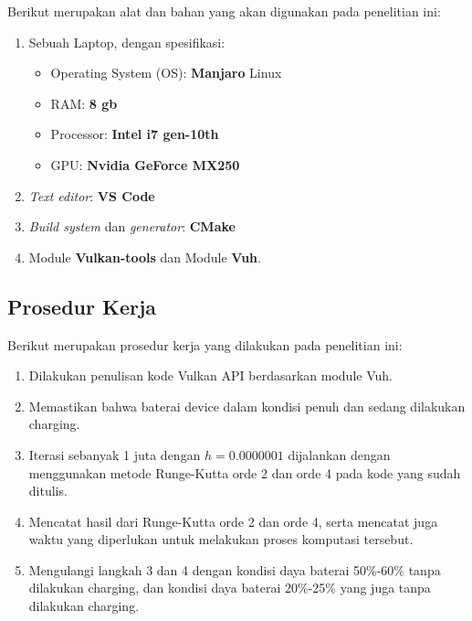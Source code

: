 Berikut merupakan alat dan bahan yang akan digunakan pada penelitian
ini:

\begin{enumerate}
\def\labelenumi{\arabic{enumi}.}
\tightlist
\item
  Sebuah Laptop, dengan spesifikasi:

  \begin{itemize}
  \tightlist
  \item
    Operating System (OS): \textbf{Manjaro} Linux
  \item
    RAM: \textbf{8 gb}
  \item
    Processor: \textbf{Intel i7 gen-10th}
  \item
    GPU: \textbf{Nvidia GeForce MX250}
  \end{itemize}
\item
  \emph{Text editor}: \textbf{VS Code}
\item
  \emph{Build system} dan \emph{generator}: \textbf{CMake}
\item
  Module \textbf{Vulkan-tools} dan Module \textbf{Vuh}.
\end{enumerate}

\hypertarget{prosedur-kerja}{%
\subsection{Prosedur Kerja}\label{prosedur-kerja}}

Berikut merupakan prosedur kerja yang dilakukan pada penelitian ini:

\begin{enumerate}
\def\labelenumi{\arabic{enumi}.}
\tightlist
\item
  Dilakukan penulisan kode Vulkan API berdasarkan module Vuh.
\item
  Memastikan bahwa baterai device dalam kondisi penuh dan sedang
  dilakukan charging.
\item
  Iterasi sebanyak 1 juta dengan \(h = 0.0000001\) dijalankan dengan
  menggunakan metode Runge-Kutta orde 2 dan orde 4 pada kode yang sudah
  ditulis.
\item
  Mencatat hasil dari Runge-Kutta orde 2 dan orde 4, serta mencatat juga
  waktu yang diperlukan untuk melakukan proses komputasi tersebut.
\item
  Mengulangi langkah 3 dan 4 dengan kondisi daya baterai 50\%-60\% tanpa
  dilakukan charging, dan kondisi daya baterai 20\%-25\% yang juga tanpa
  dilakukan charging.
\end{enumerate}


